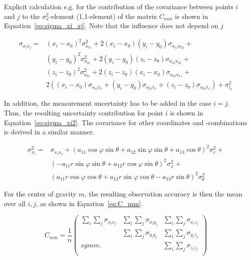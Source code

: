 \documentclass[preprint,12pt,3p]{elsarticle}
\begin{document}
Explicit calculation e.g. for the contribution of the covariance between points $i$ and $j$ to the $\sigma_{x}^2$-element (1,1-element) of the matrix $C_{mm}$ is shown in Equation~\ref{eq:sigma_xi_xj}. Note that the influence does not depend on $j$ 

\begin{equation}
\begin{array}{rl}
    \sigma_{x_i  x_j} = & \left( x_i-x_0 \right)^2 \sigma^2_{a_{11}} + 2 \left(x_i -x_0 \right) \left( y_i - y_0 \right) \sigma_{a_{11}a_{21}} + \\
    &
    \left( y_i-y_0 \right)^2 \sigma^2_{a_{21}} + 2 \left(y_i -y_0 \right) \left( z_i - z_0 \right) \sigma_{a_{21}a_{31}} + \\
    &
    \left( z_i-z_0 \right)^2 \sigma^2_{a_{31}} + 2 \left(z_i -z_0 \right) \left( x_i - x_0 \right) \sigma_{a_{31}a_{11}} + \\
    &
    2 \left( \left( x_i - x_0 \right) \sigma_{a_{11} t_x}+ \left( y_i - y_0 \right) \sigma_{a_{21} t_x}+ \left( z_i - z_0 \right) \sigma_{a_{31} t_x} \right) + \sigma^2_{t_x}
\end{array}
\label{eq:sigma_xi_xj}
\end{equation}

In addition, the measurement uncertainty has to be added in the case $i=j$. Thus, the resulting uncertainty contribution for point $i$ is shown in Equation~\ref{eq:sigma_xi2}. The covariance for other coordinates and -combinations is derived in a similar manner.

\begin{equation}
\begin{array}{rl}
    \sigma_{x_i}^2 = & \sigma_{x_i  x_j} + \left( a_{11} \cos \varphi \sin \theta + a_{12} \sin \varphi \sin \theta + a_{13} \cos \theta \right)^2 \sigma_{r}^2 +\\
    & \left( - a_{11} r \sin \varphi \sin \theta + a_{12} r \cos \varphi \sin \theta \right) ^2 \sigma_{\varphi}^2 + \\
    & \left( a_{11} r \cos \varphi \cos \theta + a_{12} r \sin \varphi \cos \theta - a_{13} r \sin \theta \right)^2 \sigma_{\theta}^2
\end{array}
\label{eq:sigma_xi2}
\end{equation}

For the center of gravity $m$, the resulting observation accuracy is then the mean over all $i,j$, as shown in Equation~\ref{eq:C_mm}.


\begin{equation}
C_{mm} =  \frac{1}{n}
   \begin{pmatrix}
    \sum_i \sum_j \sigma_{x_i x_j} & \sum_i \sum_j \sigma_{x_i y_j} & \sum_i \sum_j \sigma_{x_i z_j} \\
    
      & \sum_i \sum_j \sigma_{y_i y_j} & \sum_i \sum_j \sigma_{y_i z_j} \\
    
    symm. &  & \sum_i \sum_j \sigma_{z_i z_j} \\
    
    \end{pmatrix}
    \label{eq:C_mm}
\end{equation}
\end{document}
